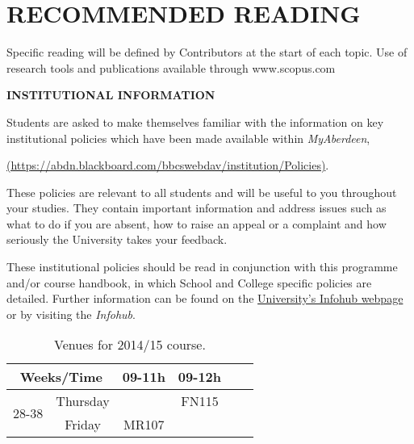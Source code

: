 \documentclass[12pts,a4paper,amsmath,amssymb,floatfix]{article}%
\begin{document}
\section{RECOMMENDED READING}

Specific reading will be defined by Contributors at the start of each topic. Use of research tools
and publications available through www.scopus.com

\bigskip


\begin{center}
{\large {\bf INSTITUTIONAL INFORMATION}}
\end{center}


Students are asked to make themselves familiar with the information on key institutional policies which have been made available within {\it MyAberdeen},
\begin{center}
\href{https://abdn.blackboard.com/bbcswebdav/institution/Policies}{(https://abdn.blackboard.com/bbcswebdav/institution/Policies)}.
\end{center}
These policies are relevant to all students and will be useful to you throughout your studies. They contain important information and address issues such as what to do if you are absent, how to raise an appeal or a complaint and how seriously the University takes your feedback. 
\medskip

These institutional policies should be read in conjunction with this programme and/or course handbook, in which School and College specific policies are detailed. Further information can be found on the \href{http:www.abdn.ac.uk/infohub/}{University's Infohub webpage} or by visiting the {\it Infohub}.

\begin{table}[h]
\begin{center}
\begin{tabular}{ c || c | c c c | c }
\hline\hline
\multicolumn{2}{c}{\bf Weeks/Time} & {\bf 09-11h} & {\bf 09-12h}   \\
\hline\hline
\multirow{2}{*}{28-38} & Thursday  &              &  FN115         \\
                       & Friday    &   MR107      &                \\
\hline 
\end{tabular}
\end{center}
\caption{Venues for 2014/15 course.}
\label{table:timetable}
\end{table}
\end{document}
